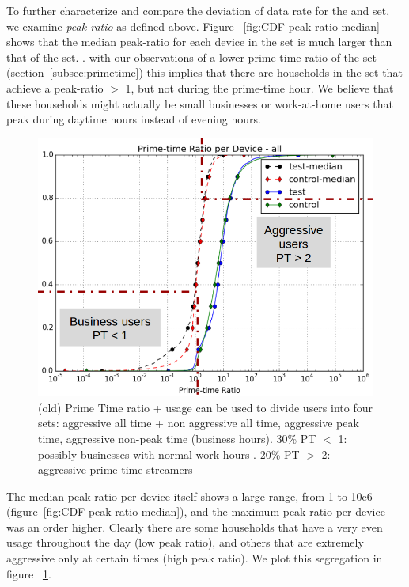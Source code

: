 To further characterize and compare the deviation of data rate for the \control and \test set, we examine \emph{peak-ratio} as defined above. 
Figure ~\ref{fig:CDF-peak-ratio-median} shows that the median peak-ratio for each device in the \test set is much larger than that of the \control set.
.
 with our observations of a lower prime-time ratio of the \test set (section~\ref{subsec:primetime}) this implies that there are households in the \test set that achieve a peak-ratio $>$ 1, but not during the prime-time hour. We believe that these households might actually be small businesses or work-at-home users that peak during daytime hours instead of evening hours.

\begin{figure}[ht]
\begin{minipage}{0.9\linewidth}
\centering
\includegraphics[width=0.9\linewidth]{figures/cdf-prime-time-ratio[replace].png}
\caption{(old) Prime Time ratio + usage can be used to divide users into four sets: aggressive all time + non aggressive all time, aggressive peak time, aggressive non-peak time (business hours). 30\% PT $<$ 1: possibly businesses with normal work-hours . 20\% PT $>$ 2: aggressive prime-time streamers}
\label{fig:CDF-prime-time-ratio}
\end{minipage}
\end{figure}

The median peak-ratio per device itself shows a large range, from 1 to 10e6 (figure~\ref{fig:CDF-peak-ratio-median}), and the maximum peak-ratio per device was an order higher. Clearly there are some households that have a very even usage throughout the day (low peak ratio), and others that are extremely aggressive only at certain times (high peak ratio). We plot this segregation in figure ~\ref{fig:CDF-prime-time-ratio}.


